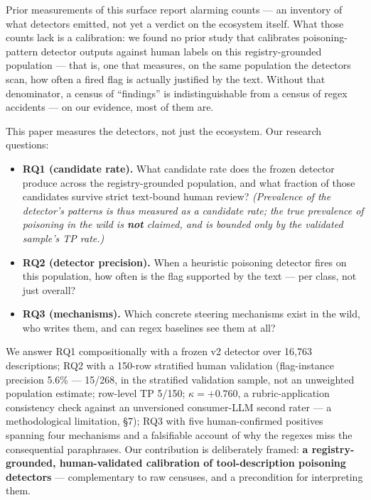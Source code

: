 \documentclass[10pt,conference]{IEEEtran}
\begin{document}
Prior measurements of this surface report alarming counts --- an inventory of what
detectors emitted, not yet a verdict on the ecosystem itself. What those counts lack is a
calibration: we found no prior study that calibrates poisoning-pattern detector outputs
against human labels on this registry-grounded population --- that is, one that measures, on
the same population the detectors scan, how often a fired flag is actually justified by
the text. Without that denominator, a census of
``findings'' is indistinguishable from a census of regex accidents --- on our evidence, most
of them are.

This paper measures the detectors, not just the ecosystem. Our research questions:

\begin{itemize}
\item \textbf{RQ1 (candidate rate).} What candidate rate does the frozen detector produce
  across the registry-grounded population, and what fraction of those candidates survive
  strict text-bound human review? \emph{(Prevalence of the detector's patterns is thus
  measured as a candidate rate; the true prevalence of poisoning in the wild is
  \textbf{not} claimed, and is bounded only by the validated sample's TP rate.)}
\item \textbf{RQ2 (detector precision).} When a heuristic poisoning detector fires on this
  population, how often is the flag supported by the text --- per class, not just overall?
\item \textbf{RQ3 (mechanisms).} Which concrete steering mechanisms exist in the wild, who
  writes them, and can regex baselines see them at all?
\end{itemize}

We answer RQ1 compositionally with a frozen v2 detector over 16,763 descriptions; RQ2
with a 150-row stratified human validation (flag-instance precision 5.6\% --- 15/268, in
the stratified validation sample, not an unweighted population estimate; row-level TP
5/150; $\kappa = +0.760$, a rubric-application consistency check against an unversioned
consumer-LLM second rater --- a methodological limitation, \S7); RQ3 with five human-confirmed positives
spanning four mechanisms and a falsifiable account of why the regexes miss the
consequential paraphrases. Our contribution is deliberately framed: \textbf{a registry-grounded,
human-validated calibration of tool-description poisoning detectors} --- complementary to
raw censuses, and a precondition for interpreting them.
\end{document}
